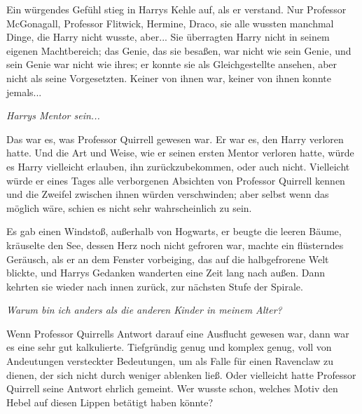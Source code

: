 Ein würgendes Gefühl stieg in Harrys Kehle auf, als er verstand. Nur Professor
McGonagall, Professor Flitwick, Hermine, Draco, sie alle wussten manchmal Dinge,
die Harry nicht wusste, aber... Sie überragten Harry nicht in seinem eigenen
Machtbereich; das Genie, das sie besaßen, war nicht wie sein Genie, und sein
Genie war nicht wie ihres; er konnte sie als Gleichgestellte ansehen, aber nicht
als seine Vorgesetzten. Keiner von ihnen war, keiner von ihnen konnte jemals...

\emph{Harrys Mentor sein...}

Das war es, was Professor Quirrell gewesen war. Er war es, den Harry verloren
hatte. Und die Art und Weise, wie er seinen ersten Mentor verloren hatte, würde
es Harry vielleicht erlauben, ihn zurückzubekommen, oder auch nicht. Vielleicht
würde er eines Tages alle verborgenen Absichten von Professor Quirrell kennen
und die Zweifel zwischen ihnen würden verschwinden; aber selbst wenn das möglich
wäre, schien es nicht sehr wahrscheinlich zu sein.

Es gab einen Windstoß, außerhalb von Hogwarts, er beugte die leeren Bäume,
kräuselte den See, dessen Herz noch nicht gefroren war, machte ein flüsterndes
Geräusch, als er an dem Fenster vorbeiging, das auf die halbgefrorene Welt
blickte, und Harrys Gedanken wanderten eine Zeit lang nach außen. Dann kehrten
sie wieder nach innen zurück, zur nächsten Stufe der Spirale.

\emph{Warum bin ich anders als die anderen Kinder in meinem Alter?}

Wenn Professor Quirrells Antwort darauf eine Ausflucht gewesen war, dann war es
eine sehr gut kalkulierte. Tiefgründig genug und komplex genug, voll von
Andeutungen versteckter Bedeutungen, um als Falle für einen Ravenclaw zu dienen,
der sich nicht durch weniger ablenken ließ. Oder vielleicht hatte Professor
Quirrell seine Antwort ehrlich gemeint. Wer wusste schon, welches Motiv den
Hebel auf diesen Lippen betätigt haben könnte?

